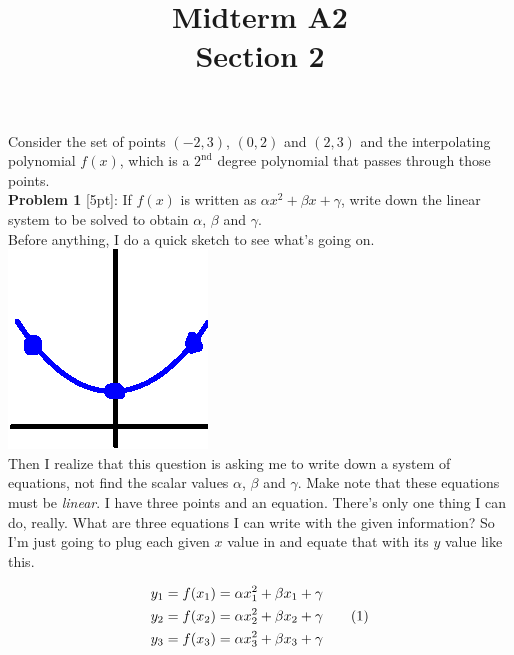 \documentclass{article}
\newcommand\numberthis{\addtocounter{equation}{1}\tag{\theequation}}
\def\a{\alpha}
\def\b{\beta}
\def\c{\gamma}
\begin{document}
 
 
 
\title{
    \textmd{\Huge{Midterm A2}}\\
    \textmd{\huge{Section 2}}
}


\maketitle

Consider the set of points $(-2, 3)$, $(0, 2)$ and $(2, 3)$ and the interpolating polynomial $f(x)$, which is a $2^\text{nd}$ degree polynomial that passes through those points. \\

\textbf{Problem 1} [5pt]: If $f(x)$ is written as $\a x^2 + \b x + \c$, write down the linear system to be solved to obtain $\a$, $\b$ and $\c$. \\

Before anything, I do a quick sketch to see what's going on. \hspace*{3cm}\includegraphics[scale=0.5]{thumbSketch}\\

Then I realize that this question is asking me to write down a system of equations, not find the scalar values $\a$, $\b$ and $\c$. Make note that these equations must be \textit{linear}. I have three points and an equation. There's only one thing I can do, really. What are three equations I can write with the given information? So I'm just going to plug each given $x$ value in and equate that with its $y$ value like this.

\begin{align*}
y_1 &= f(x_1) = \a x_1^2 + \b x_1 + \c \\
y_2 &= f(x_2) = \a x_2^2 + \b x_2 + \c \numberthis \\
y_3 &= f(x_3) = \a x_3^2 + \b x_3 + \c  \\
\end{align*}
\end{document}
